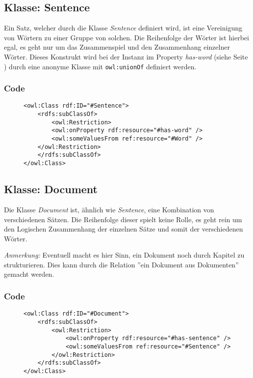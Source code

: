 \documentclass[
    11pt,
    latin1,
    a4paper,
    oneside
]{scrreprt}
\begin{document}
\subsection{Klasse: Sentence} \label{sec:class_sentence}

Ein Satz, welcher durch die Klasse \emph{Sentence} definiert wird, ist eine Vereinigung von W\"ortern zu einer Gruppe von solchen. Die Reihenfolge der W\"orter ist hierbei egal, es geht nur um das Zusammenspiel und den Zusammenhang einzelner W\"orter. Dieses Konstrukt wird bei der Instanz im Property \emph{has-word} (siehe  Seite \pageref{sec:rel_hasword}) durch eine anonyme Klasse mit \texttt{owl:unionOf} definiert werden.

\subsubsection{Code}  \label{sec:class_sentence_code}

\begin{figure}[h]
 \lstset{language=XML}
 \begin{lstlisting}[label=owl:word]
<owl:Class rdf:ID="#Sentence">
	<rdfs:subClassOf>
		<owl:Restriction>
		<owl:onProperty rdf:resource="#has-word" />
		<owl:someValuesFrom ref:resource="#Word" />
	</owl:Restriction>
	</rdfs:subClassOf>
</owl:Class>
 \end{lstlisting}
\end{figure}

\subsection{Klasse: Document} \label{sec:class_document}

Die Klasse \emph{Document} ist, \"ahnlich wie \emph{Sentence}, eine Kombination von verschiedenen S\"atzen. Die Reihenfolge dieser spielt keine Rolle, es geht rein um den Logischen Zusammenhang der einzelnen S\"atze und somit der verschiedenen W\"orter.

\textit{Anmerkung:} Eventuell macht es hier Sinn, ein Dokument noch durch Kapitel zu strukturieren. Dies kann durch die Relation ''ein Dokument aus Dokumenten'' gemacht werden.

\subsubsection{Code}  \label{sec:class_sentence_code}

\begin{figure}[h]
 \lstset{language=XML}
 \begin{lstlisting}[label=owl:word]
<owl:Class rdf:ID="#Document">
	<rdfs:subClassOf>
		<owl:Restriction>
			<owl:onProperty rdf:resource="#has-sentence" />
			<owl:someValuesFrom ref:resource="#Sentence" />
		</owl:Restriction>
	</rdfs:subClassOf>
</owl:Class>
 \end{lstlisting}
\end{figure}
\end{document}
